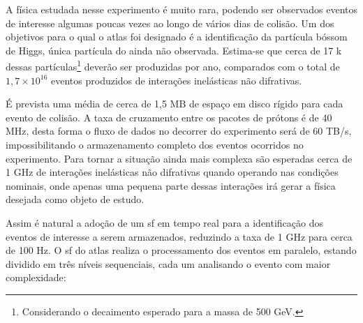 A física estudada nesse experimento é muito rara, podendo ser observados eventos
de interesse algumas poucas vezes ao longo de vários dias de colisão. 
Um dos objetivos para o qual o \gls{atlas} foi 
designado é a identificação da partícula bóssom de Higgs, única partícula 
do  ainda não observada. Estima-se que cerca de 17 k dessas
partículas\footnote{Considerando o decaimento esperado para a massa de 500 GeV.} deverão ser produzidas por ano, comparados
com o total de $1,7\times10^{16}$ eventos produzidos de interações inelásticas
não difrativas. 


É prevista uma média de cerca de 1,5 MB de espaço em disco rígido para cada evento de 
colisão. A taxa de cruzamento entre os pacotes de prótons é de 40 MHz, 
desta forma o fluxo de dados no decorrer do experimento será de 60 TB/s, impossibilitando o
armazenamento completo dos eventos ocorridos no experimento. Para tornar a
situação ainda mais complexa são esperadas cerca de 1 GHz de interações
inelásticas não difrativas quando operando nas condições nominais, onde apenas
uma pequena parte dessas interações irá gerar a física desejada como objeto de
estudo.

Assim é natural a adoção de um \glsdesc{sf} em tempo real para a
identificação dos eventos de interesse a serem armazenados, reduzindo a taxa de 1 GHz
para cerca de 100 Hz. O \glsdesc{sf} do \gls{atlas} realiza o processamento dos 
eventos em paralelo, estando dividido em três níveis sequenciais, cada um 
analisando o evento com maior complexidade:


